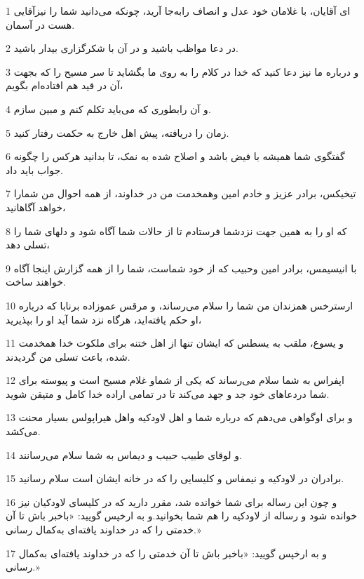 \par 1 ای آقایان، با غلامان خود عدل و انصاف رابه‌جا آرید، چونکه می‌دانید شما را نیزآقایی هست در آسمان.
\par 2 در دعا مواظب باشید و در آن با شکرگزاری بیدار باشید.
\par 3 و درباره ما نیز دعا کنید که خدا در کلام را به روی ما بگشاید تا سر مسیح را که بجهت آن در قید هم افتاده‌ام بگویم،
\par 4 و آن رابطوری که می‌باید تکلم کنم و مبین سازم.
\par 5 زمان را دریافته، پیش اهل خارج به حکمت رفتار کنید.
\par 6 گفتگوی شما همیشه با فیض باشد و اصلاح شده به نمک، تا بدانید هرکس را چگونه جواب باید داد.
\par 7 تیخیکس، برادر عزیز و خادم امین وهمخدمت من در خداوند، از همه احوال من شمارا خواهد آگاهانید،
\par 8 که او را به همین جهت نزدشما فرستادم تا از حالات شما آگاه شود و دلهای شما را تسلی دهد،
\par 9 با انیسیمس، برادر امین وحبیب که از خود شماست، شما را از همه گزارش اینجا آگاه خواهند ساخت.
\par 10 ارسترخس همزندان من شما را سلام می‌رساند، و مرقس عموزاده برنابا که درباره او حکم یافته‌اید، هرگاه نزد شما آید او را بپذیرید،
\par 11 و یسوع، ملقب به یسطس که ایشان تنها از اهل ختنه برای ملکوت خدا همخدمت شده، باعث تسلی من گردیدند.
\par 12 اپفراس به شما سلام می‌رساند که یکی از شماو غلام مسیح است و پیوسته برای شما دردعاهای خود جد و جهد می‌کند تا در تمامی اراده خدا کامل و متیقن شوید.
\par 13 و برای اوگواهی می‌دهم که درباره شما و اهل لاودکیه واهل هیراپولس بسیار محنت می‌کشد.
\par 14 و لوقای طبیب حبیب و دیماس به شما سلام می‌رسانند.
\par 15 برادران در لاودکیه و نیمفاس و کلیسایی را که در خانه ایشان است سلام رسانید.
\par 16 و چون این رساله برای شما خوانده شد، مقرر دارید که در کلیسای لاودکیان نیز خوانده شود و رساله از لاودکیه را هم شما بخوانید.و به ارخپس گویید: «باخبر باش تا آن خدمتی را که در خداوند یافته‌ای به‌کمال رسانی.»
\par 17 و به ارخپس گویید: «باخبر باش تا آن خدمتی را که در خداوند یافته‌ای به‌کمال رسانی.»



